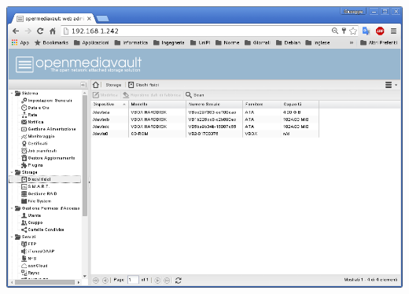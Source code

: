 \documentclass[11pt,xcolor=table]{beamer}
\begin{document}
\begin{frame}
\begin{columns}
\begin{column}{0.48\textwidth}
			\vspace{1mm}
			\includegraphics[width=\textwidth]{OMV/OMV5.png}
		\end{column}
	\end{columns}
\end{frame}
\end{document}

